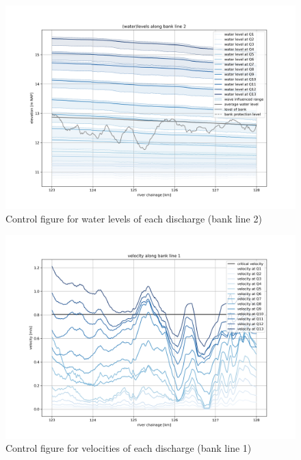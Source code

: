 \begin{figure}
\includegraphics[width=\textwidth]{figures/7_levels_bank_2.png}
\caption{Control figure for water levels of each discharge (bank line 2)}
\label{Fig2.9}
\end{figure}

\begin{figure}
\includegraphics[width=\textwidth]{figures/8_velocity_bank_1.png}
\caption{Control figure for velocities of each discharge (bank line 1)}
\label{Fig2.10}
\end{figure}

